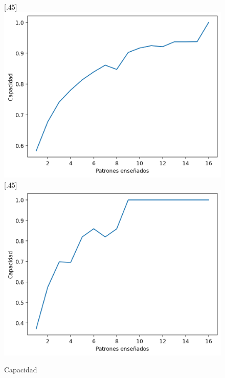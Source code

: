 \documentclass[12pt,a4paper]{article}
\begin{document}
\begin{figure}[H]
  [.45\linewidth]{
    \includegraphics[width=\linewidth]{img/9-capacity.png}
  }
  [.45\linewidth]{
    \includegraphics[width=\linewidth]{img/10-capacity.png}
  }
  \caption*{Capacidad}
  \centering
\end{figure}

\newpage
\end{document}
